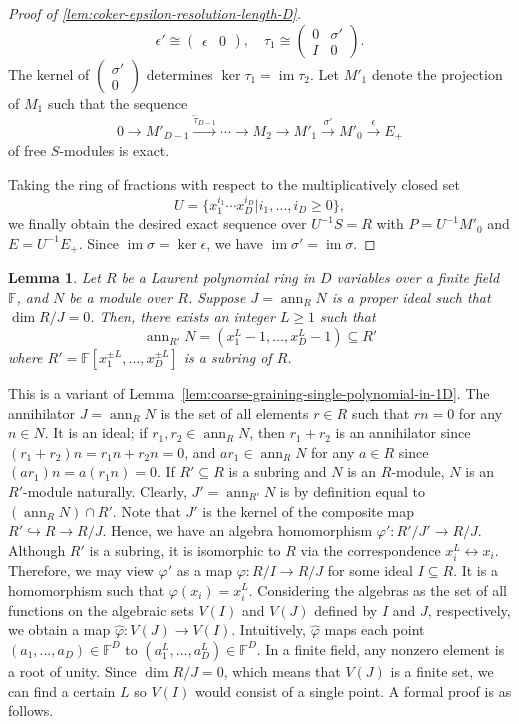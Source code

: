 \documentclass[letterpaper,12pt]{amsart}
\newtheorem{lem}{Lemma}[section]
\theoremstyle{definition} \newtheorem{defn}{Definition}
\theoremstyle{definition} \newtheorem{rem}{Remark}
\theoremstyle{definition} \newtheorem{example}{Example}
\newcommand{\im}{\mathop{\mathrm{im}}}
\newcommand{\ann}{\mathop{\mathrm{ann}}}
\newcommand{\FF}{\mathbb{F}}
\begin{document}
\begin{proof}[Proof of \ref{lem:coker-epsilon-resolution-length-D}]
\[
\epsilon' \cong
\begin{pmatrix}
 \epsilon & 0
\end{pmatrix} ,
\quad
 \tau_1 \cong
\begin{pmatrix}
 0 & \sigma' \\
 I & 0
\end{pmatrix} .
\]
The kernel of $\begin{pmatrix} \sigma' \\ 0 \end{pmatrix}$ determines $\ker \tau_1 = \im \tau_2$.
Let $M'_1$ denote the projection of $M_1$ such that the sequence
\[
 0 \to M'_{D-1} \xrightarrow{\tilde \tau_{D-1}}
 \cdots \to M_2 \to M'_1 \xrightarrow{\sigma'} M'_0 \xrightarrow{\epsilon} E_+ 
\]
of free $S$-modules is exact.

Taking the ring of fractions with respect to the multiplicatively closed set 
\[
U = \{x_1^{i_1} \cdots x_D^{i_D} | i_1,\ldots,i_D \ge 0\},
\]
we finally obtain the desired exact sequence over $U^{-1}S = R$ 
with $P = U^{-1}M'_0$ and $E = U^{-1}E_+$.
Since $\im \sigma = \ker \epsilon$, we have $\im \sigma' = \im \sigma$.
\end{proof}


\begin{lem}
Let $R$ be a Laurent polynomial ring in $D$ variables over a finite field $\FF$,
and $N$ be a module over $R$.
Suppose $J = \ann_R N$ is a proper ideal such that $\dim R/J = 0$.
Then, there exists an integer $L \ge 1$ such that
\[
 \ann_{R'} N = (x_1^L -1, \ldots, x_D^L -1) \subseteq R'
\]
where $R' = \FF[x_1^{\pm L},\ldots,x_D^{\pm L}]$ is a subring of $R$.
\label{lem:zero-dim-ideal-over-finite-field}
\end{lem}

This is a variant of Lemma~\ref{lem:coarse-graining-single-polynomial-in-1D}.
The annihilator $J = \ann_R N$ is the set of all elements $r \in R$ such that
$r n = 0$ for any $n \in N$.
It is an ideal;
if $r_1, r_2 \in \ann_R N$, then
$r_1+r_2$ is an annihilator since $(r_1 + r_2)n = r_1 n + r_2 n = 0$,
and $a r_1 \in \ann_R N$ for any $a \in R$ since $(a r_1) n = a(r_1 n)=0$.
If $R' \subseteq R$ is a subring and $N$ is an $R$-module,
$N$ is an $R'$-module naturally.
Clearly, $J' = \ann_{R'} N$ is by definition equal to $(\ann_{R} N) \cap R'$.
Note that $J'$ is the kernel of the composite map $R' \hookrightarrow R \to R/J$.
Hence, we have an algebra homomorphism $\varphi' : R'/J' \to R/J$.
Although $R'$ is a subring, it is isomorphic to $R$ via the correspondence $x_i^L \leftrightarrow x_i$.
Therefore, we may view $\varphi'$ as a map $\varphi: R/I \to R/J$ for some ideal $I \subseteq R$.
It is a homomorphism such that $\varphi(x_i) = x_i^L$.
Considering the algebras as the set of all functions on the algebraic sets $V(I)$ and $V(J)$ defined by $I$ and $J$, respectively,
we obtain a map $\hat \varphi : V(J) \to V(I)$.
Intuitively, $\hat \varphi$ maps each point $(a_1,\ldots,a_D) \in \FF^D$ to $(a_1^L,\ldots,a_D^L) \in \FF^D$.
In a finite field, any nonzero element is a root of unity.
Since $\dim R/J = 0$, which means that $V(J)$ is a finite set, we can find a certain $L$
so $V(I)$ would consist of a single point. A formal proof is as follows.
\end{document}

